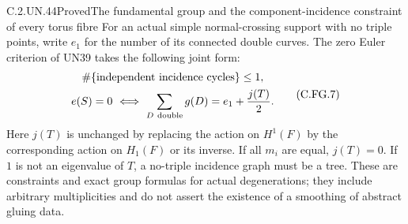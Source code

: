 \begin{statement}{C.2.UN.44}{Proved}{The fundamental group and the component-incidence constraint of every torus fibre}
For an actual simple normal-crossing support with no triple points,
write $e_1$ for the number of its connected double curves. The zero
Euler criterion of UN39 takes the following joint form:
\[
 \begin{gathered}
 \#\{
      \text{independent incidence cycles}\}\le1,\\
 e(S)=0\ \Longleftrightarrow\
       \sum_{D\ {\rm double}}g(D)=e_1+\frac{j(T)}2 .
 \end{gathered}
                                                        \tag{C.FG.7}
\]
Here $j(T)$ is unchanged by replacing the action on $H^1(F)$ by
the corresponding action on $H_1(F)$ or its inverse. If all $m_i$
are equal, $j(T)=0$. If $1$ is not an eigenvalue of $T$, a
no-triple incidence graph must be a tree.
These are constraints and exact group formulas
for actual degenerations; they include arbitrary multiplicities
and do not assert the existence of a smoothing of abstract gluing data.
\end{statement}

